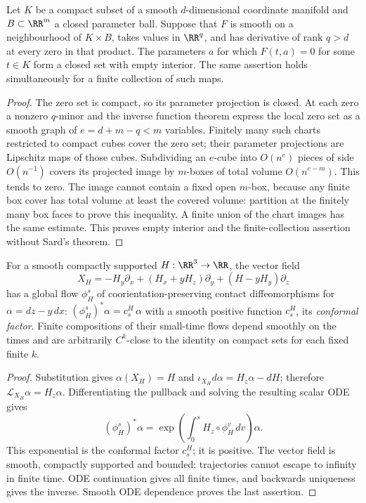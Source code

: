 \begin{lemma}\label{fd:parameter-avoidance}\leanok
Let $K$ be a compact subset of a smooth $d$-dimensional coordinate
manifold and $B\subset\RR^m$ a closed parameter ball. Suppose that
$F$ is smooth on a neighbourhood of $K\times B$, takes values in
$\RR^q$, and has derivative of rank $q>d$ at every zero in that product.
The parameters $a$ for which $F(t,a)=0$ for some $t\in K$ form a closed
set with empty interior. The same assertion holds simultaneously for
a finite collection of such maps.

\end{lemma}
\begin{proof}\leanok
The zero set is compact, so its parameter projection is closed.
At each zero a nonzero $q$-minor and the inverse function theorem express
the local zero set as a smooth graph of $e=d+m-q<m$ variables.
Finitely many such charts restricted to compact cubes cover the zero
set; their parameter projections are Lipschitz maps of those cubes.
Subdividing an $e$-cube into $O(n^e)$ pieces of side $O(n^{-1})$ covers
its projected image by $m$-boxes of total volume $O(n^{e-m})$.
This tends to zero. The image cannot contain a fixed open $m$-box,
because any finite box cover has total volume at least the covered
volume: partition at the finitely many box faces to prove this inequality.
A finite union of the chart images has the same estimate. This proves
empty interior and the finite-collection assertion without Sard's theorem.
\end{proof}

\begin{lemma}\label{fd:contact-motions}\leanok
For a smooth compactly supported $H:\RR^3\to\RR$, the vector field
\begin{equation}
 X_H=-H_y\partial_x+(H_x+yH_z)\partial_y+(H-yH_y)\partial_z
\end{equation}
has a global flow $\phi_H^s$ of coorientation-preserving contact
diffeomorphisms for $\alpha=dz-y\,dx$: $(\phi_H^s)^*\alpha=c^H_s\,\alpha$
with a smooth positive function $c^H_s$, its \emph{conformal factor}. Finite compositions of their
small-time flows depend smoothly on the times and are arbitrarily
$C^k$-close to the identity on compact sets for each fixed finite $k$.

\end{lemma}
\begin{proof}\leanok
Substitution gives $\alpha(X_H)=H$ and
$\iota_{X_H}d\alpha=H_z\alpha-dH$; therefore
$\mathcal L_{X_H}\alpha=H_z\alpha$. Differentiating the pullback and
solving the resulting scalar ODE gives
\begin{equation}
 (\phi_H^s)^*\alpha
 =\exp\left(\int_0^s H_z\circ\phi_H^v\,dv\right)\alpha.
\end{equation}
This exponential is the conformal factor $c^H_s$; it is positive. The vector field is smooth, compactly supported
and bounded; trajectories cannot escape to infinity in finite time.
ODE continuation gives all finite times, and backwards uniqueness gives
the inverse. Smooth ODE dependence proves the last assertion.
\end{proof}

